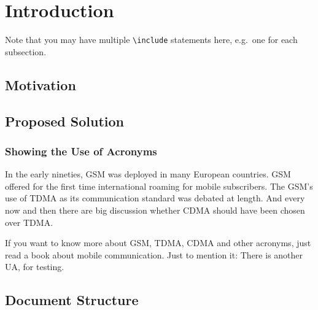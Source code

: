 \chapter{Introduction}

Note that you may have multiple \texttt{{\textbackslash}include} statements here, e.g.\ one for each subsection.

\section{Motivation} %
\blindtext

\section{Proposed Solution} 
\blindtext

\subsection{Showing the Use of Acronyms}

In the early nineties, \acs{GSM} was deployed in many European countries. \ac{GSM} offered for the first time international roaming for mobile subscribers. The \acs{GSM}’s use of \ac{TDMA} as its communication standard was debated at length. And every now and then there are big discussion whether \ac{CDMA} should have been chosen over \ac{TDMA}.

If you want to know more about \acf{GSM}, \acf{TDMA}, \acf{CDMA} and other acronyms, just read a book about mobile communication. Just to mention it: There is another \ac{UA}, for testing.


\section{Document Structure}

\blindtext
